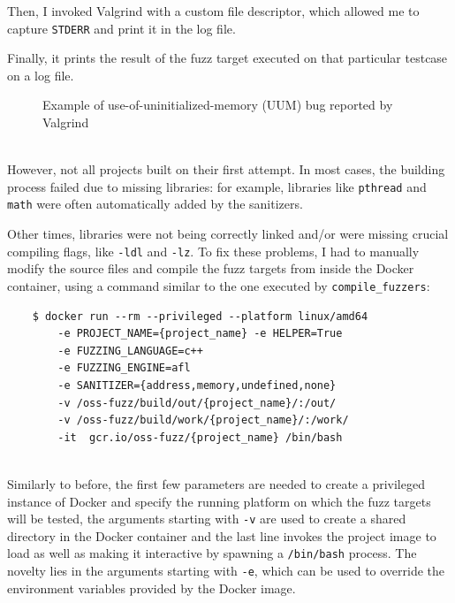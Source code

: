 Then, I invoked Valgrind with a custom file descriptor, which allowed me to capture \verb|STDERR| and print it in the log file.

Finally, it prints the result of the fuzz target executed on that particular testcase on a log file.

\begin{figure}[h]
\caption{Example of use-of-uninitialized-memory (UUM) bug reported by Valgrind}
\label{fig:valgrind_example}
\end{figure}
\ \\


\newpage
However, not all projects built on their first attempt.
In most cases, the building process failed due to missing libraries: for example, libraries like \verb|pthread| and \verb|math| were often automatically added by the sanitizers.

Other times, libraries were not being correctly linked and/or were missing crucial compiling flags, like \verb|-ldl| and \verb|-lz|.
To fix these problems, I had to manually modify the source files and compile the fuzz targets from inside the Docker container, using a command similar to the one executed by \verb|compile_fuzzers|:
\begin{verbatim}
    $ docker run --rm --privileged --platform linux/amd64 
        -e PROJECT_NAME={project_name} -e HELPER=True 
        -e FUZZING_LANGUAGE=c++ 
        -e FUZZING_ENGINE=afl 
        -e SANITIZER={address,memory,undefined,none} 
        -v /oss-fuzz/build/out/{project_name}/:/out/   
        -v /oss-fuzz/build/work/{project_name}/:/work/
        -it  gcr.io/oss-fuzz/{project_name} /bin/bash
\end{verbatim}
\ \\
Similarly to before, the first few parameters are needed to create a privileged instance of Docker and specify the running platform on which the fuzz targets will be tested, the arguments starting with \verb|-v| are used to create a shared directory in the Docker container and the last line invokes the project image to load as well as making it interactive by spawning a \verb|/bin/bash| process.
The novelty lies in the arguments starting with \verb|-e|, which can be used to override the environment variables provided by the Docker image.

